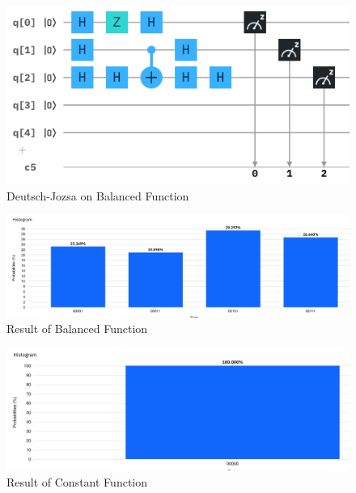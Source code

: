 \documentclass[12pt]{article}
\begin{document}
\begin{figure}[ht]
\begin{minipage}{0.35\linewidth}
            \end{minipage}%
            \begin{minipage}{0.65\linewidth}
                \includegraphics[width=\linewidth]{Circuits/Deutsch-Jozsa.png}
            \end{minipage}
            \caption{Deutsch-Jozsa on Balanced Function}
        \end{figure}
        \begin{figure}[ht]
            \centering
            \includegraphics[width=\linewidth]{Circuits/Deutsch-Jozsa-result.png}
            \caption{Result of Balanced Function}
        \end{figure}
        \begin{figure}
            \centering
            \includegraphics[width=0.6\linewidth]{Circuits/Deutsch-Jozsa-result2.png}
            \caption{Result of Constant Function}
        \end{figure}
\end{document}
